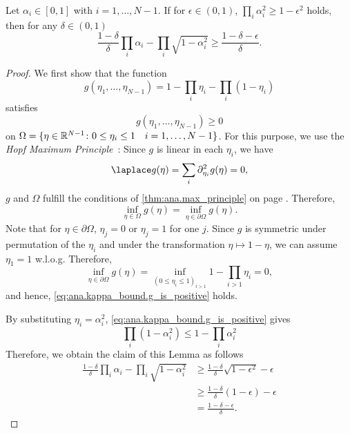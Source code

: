 \begin{lemma}%
  \label{lem:ana.kappa_bound}
  Let $\alpha_i \in [0,1]$ with $i = 1, \ldots, N - 1$.
  If for $\epsilon \in (0, 1)$, $\prod_i \alpha_i^2 \ge 1 - \epsilon^2$ holds, then for any $\delta \in (0, 1)$
  \[
    \frac{1 - \delta}{\delta} \prod_i \alpha_i - \prod_i \sqrt{1 - \alpha_i^2} \ge \frac{1 - \delta - \epsilon}{\delta}.
  \]
\end{lemma}
\begin{proof}
  We first show that the function
  \[
    g(\eta_1, \ldots, \eta_{N-1}) = 1 - \prod_i \eta_i - \prod_i \left( 1 - \eta_i \right)
  \]
  satisfies
  \[
    \label{eq:ana.kappa_bound.g_is_positive}
    g(\eta_1, \ldots, \eta_{N-1}) \ge 0
  \]
  on $\Omega = \{\eta \in {\mathbb{R}}^{N - 1}\colon 0 \le \eta_i \le 1 \quad i = 1, \ldots, N - 1\}$.
  For this purpose, we use the \emph{Hopf Maximum Principle}~\cite{Taylor}:
  Since $g$ is linear in each $\eta_i$, we have
  \[
    \laplace g (\eta) = \sum_i \partial_{\eta_i}^2 g (\eta) = 0,
  \]
  $g$ and $\Omega$ fulfill the conditions of \cref{thm:ana.max_principle} on page \pageref{thm:ana.max_principle}.
  Therefore,
  \[
    \inf_{\eta \in \Omega} g(\eta) = \inf_{\eta \in \partial \Omega} g(\eta).
  \]
  Note that for $\eta \in \partial \Omega$, $\eta_j = 0$ or $\eta_j = 1$ for one $j$.
  Since $g$ is symmetric under permutation of the $\eta_i$ and under the transformation $\eta \mapsto 1 - \eta$, we can assume $\eta_1 = 1$ w.l.o.g.
  Therefore,
  \[
    \inf_{\eta \in \partial \Omega} g(\eta) = \inf_{{(0 \le \eta_i \le 1)}_{i > 1}} 1 - \prod_{i > 1} \eta_i = 0,
  \]
  and hence, \cref{eq:ana.kappa_bound.g_is_positive} holds.

  By substituting $\eta_i = \alpha_i^2$, \cref{eq:ana.kappa_bound.g_is_positive} gives
  \[
    \label{eq:ana.kappa_bound.sqrt_to_prod}
    \prod_i \left( 1 - \alpha_i^2 \right) \le 1 - \prod_i \alpha_i^2
  \]
  Therefore, we obtain the claim of this Lemma as follows
  \begin{align}
    \frac{1 - \delta}{\delta} \prod_i \alpha_i - \prod_i \sqrt{1 - \alpha_i^2}
    &\ge \frac{1 - \delta}{\delta} \sqrt{1 - \epsilon^2} - \epsilon \\
    &\ge \frac{1 - \delta}{\delta} \left(1 - \epsilon\right) - \epsilon \\
    &= \frac{1 - \delta - \epsilon}{\delta}.
  \end{align}
\end{proof}


